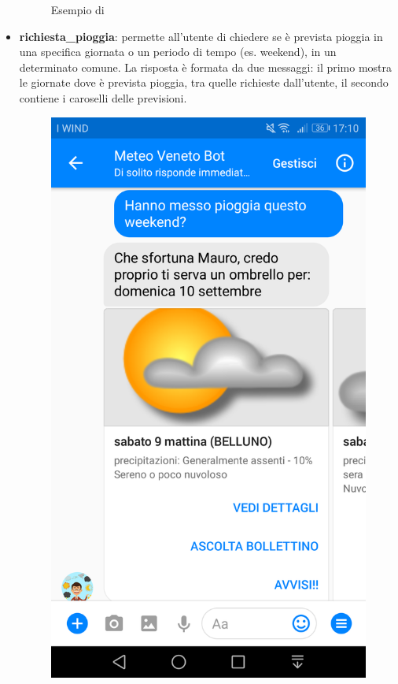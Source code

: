 \begin{itemize}
\begin{figure}[!h]
		\caption{Esempio di }
	\end{figure}	
	\item \textbf{richiesta\_pioggia}: permette all'utente di chiedere se è prevista pioggia in una specifica giornata o un periodo di tempo (es. weekend), in un determinato comune. La risposta è formata da due messaggi: il primo mostra le giornate dove è prevista pioggia, tra quelle richieste dall'utente, il secondo contiene i caroselli delle previsioni.
	\begin{figure}[!h]
		\centering
		\includegraphics[scale=0.12]{../Immagini/richiesta_pioggia.png}%

\end{figure}
\end{itemize}
